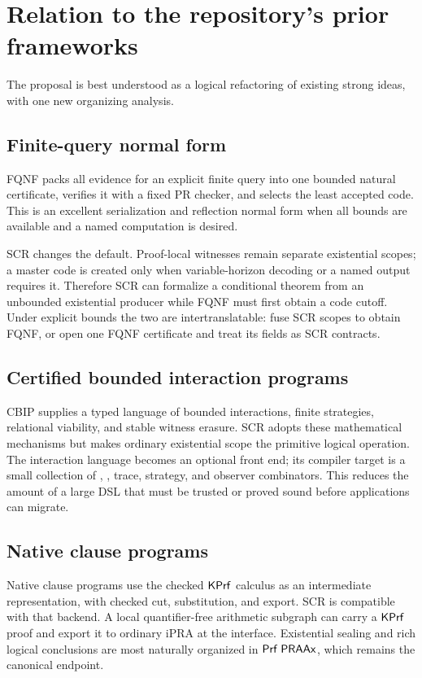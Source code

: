 \section{Relation to the repository's prior frameworks}
\label{sec:comparison}

The proposal is best understood as a logical refactoring of existing strong
ideas, with one new organizing analysis.

\subsection{Finite-query normal form}

FQNF packs all evidence for an explicit finite query into one bounded natural
certificate, verifies it with a fixed PR checker, and selects the least
accepted code.  This is an excellent serialization and reflection normal form
when all bounds are available and a named computation is desired.

SCR changes the default.  Proof-local witnesses remain separate existential
scopes; a master code is created only when variable-horizon decoding or a
named output requires it.  Therefore SCR can formalize a conditional theorem
from an unbounded existential producer while FQNF must first obtain a code
cutoff.  Under explicit bounds the two are intertranslatable: fuse SCR scopes
to obtain FQNF, or open one FQNF certificate and treat its fields as SCR
contracts.

\subsection{Certified bounded interaction programs}

CBIP supplies a typed language of bounded interactions, finite strategies,
relational viability, and stable witness erasure.  SCR adopts these
mathematical mechanisms but makes ordinary existential scope the primitive
logical operation.  The interaction language becomes an optional front end;
its compiler target is a small collection of ,
, trace, strategy, and observer combinators.  This reduces the
amount of a large DSL that must be trusted or proved sound before applications
can migrate.

\subsection{Native clause programs}

Native clause programs use the checked \(\mathsf{KPrf}\) calculus as an intermediate
representation, with checked cut, substitution, and export.  SCR is compatible
with that backend.  A local quantifier-free arithmetic subgraph can carry a
\(\mathsf{KPrf}\) proof and export it to ordinary iPRA at the interface.  Existential
sealing and rich logical conclusions are most naturally organized in
\(\mathsf{Prf}\;\mathsf{PRAAx}\), which remains the canonical endpoint.

